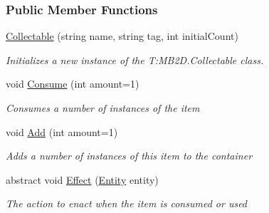 \subsubsection*{Public Member Functions}
\begin{DoxyCompactItemize}
\item 
\hyperlink{class_m_b2_d_1_1_collectable_af635d4c8ce7035b0553f0d0bf6c8a25e}{Collectable} (string name, string tag, int initial\+Count)
\begin{DoxyCompactList}\small\item\em Initializes a new instance of the T\+:\+M\+B2\+D.\+Collectable class. \end{DoxyCompactList}\item 
void \hyperlink{class_m_b2_d_1_1_collectable_a089723a457d6a6d9249e44477f25ab9d}{Consume} (int amount=1)
\begin{DoxyCompactList}\small\item\em Consumes a number of instances of the item \end{DoxyCompactList}\item 
void \hyperlink{class_m_b2_d_1_1_collectable_a81e5756a4f1420a28674502724fc2191}{Add} (int amount=1)
\begin{DoxyCompactList}\small\item\em Adds a number of instances of this item to the container \end{DoxyCompactList}\item 
abstract void \hyperlink{class_m_b2_d_1_1_collectable_aeb2c8847eb3d5937b015f298703fd753}{Effect} (\hyperlink{class_m_b2_d_1_1_entity_component_1_1_entity}{Entity} entity)
\begin{DoxyCompactList}\small\item\em The action to enact when the item is consumed or used \end{DoxyCompactList}\end{DoxyCompactItemize}

